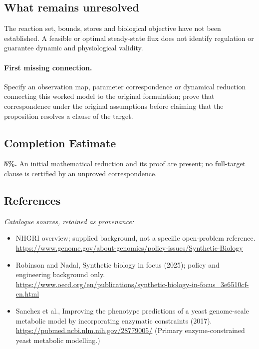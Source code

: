 \documentclass[11pt]{article}
\begin{document}
\subsection{What remains unresolved}
The reaction set, bounds, stores and biological objective have not been established. A feasible or optimal steady-state flux does not identify regulation or guarantee dynamic and physiological validity.
\paragraph{First missing connection.} Specify an observation map, parameter correspondence or dynamical reduction connecting this worked model to the original formulation; prove that correspondence under the original assumptions before claiming that the proposition resolves a clause of the target.
\subsection{Completion Estimate}
\textbf{5\%.} An initial mathematical reduction and its proof are present; no full-target clause is certified by an unproved correspondence.
\subsection{References}
\noindent\emph{Catalogue sources, retained as provenance:}
\begin{itemize}
\item NHGRI overview; supplied background, not a specific open-problem reference. \url{https://www.genome.gov/about-genomics/policy-issues/Synthetic-Biology}
\item Robinson and Nadal, Synthetic biology in focus (2025); policy and engineering background only. \url{https://www.oecd.org/en/publications/synthetic-biology-in-focus_3e6510cf-en.html}
\item Sanchez et al., Improving the phenotype predictions of a yeast genome-scale metabolic model by incorporating enzymatic constraints (2017). \url{https://pubmed.ncbi.nlm.nih.gov/28779005/} (Primary enzyme-constrained yeast metabolic modelling.)
\end{itemize}
\clearpage


\appendix
\end{document}
